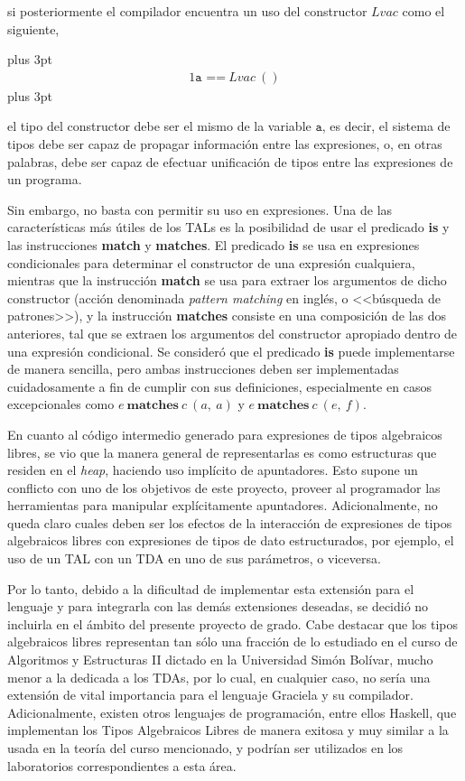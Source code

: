 {{si posteriormente el compilador encuentra un uso del constructor $Lvac$ como el
siguiente,

\abovedisplayskip=-18pt plus 3pt %
\begin{alignat*}{1}
\texttt{a ==}\  Lvac\ ()
\end{alignat*}
\abovedisplayskip=-6pt plus 3pt %

el tipo del constructor debe ser el mismo de la variable $\texttt{a}$, es decir,
el sistema de tipos debe ser capaz de propagar información entre las
expresiones, o, en otras palabras, debe ser capaz de efectuar unificación de
tipos entre las expresiones de un programa.

Sin embargo, no basta con permitir su uso en expresiones. Una de las
características más útiles de los TALs es la posibilidad de usar el predicado
\textbf{is} y las instrucciones \textbf{match} y \textbf{matches}. El predicado
\textbf{is} se usa en expresiones condicionales para determinar el constructor
de una expresión cualquiera, mientras que la instrucción \textbf{match} se usa
para extraer los argumentos de dicho constructor (acción denominada
\textit{pattern matching} en inglés, o <<búsqueda de patrones>>), y la instrucción
\textbf{matches} consiste en una composición de las dos anteriores, tal que se
extraen los argumentos del constructor apropiado dentro de una expresión
condicional. Se consideró que el predicado \textbf{is} puede implementarse de
manera sencilla, pero ambas instrucciones deben ser implementadas cuidadosamente
a fin de cumplir con sus definiciones, especialmente en casos excepcionales como
$e\ \textbf{matches}\ c\ (a,\ a)$ y $e\ \textbf{matches}\ c\ (e,\ f)$.

En cuanto al código intermedio generado para expresiones de tipos algebraicos
libres, se vio que la manera general de representarlas es como estructuras que
residen en el \textit{heap}, haciendo uso implícito de apuntadores. Esto supone un
conflicto con uno de los objetivos de este proyecto, proveer al programador las
herramientas para manipular explícitamente apuntadores. Adicionalmente, no queda
claro cuales deben ser los efectos de la interacción de expresiones de tipos
algebraicos libres con expresiones de tipos de dato estructurados, por ejemplo,
el uso de un TAL con un TDA en uno de sus parámetros, o viceversa.

Por lo tanto, debido a la dificultad de implementar esta extensión para el
lenguaje y para integrarla con las demás extensiones deseadas, se decidió no
incluirla en el ámbito del presente proyecto de grado. Cabe destacar que los
tipos algebraicos libres representan tan sólo una fracción de lo estudiado en el
curso de Algoritmos y Estructuras II dictado en la Universidad Simón Bolívar,
mucho menor a la dedicada a los TDAs, por lo cual, en cualquier caso, no sería
una extensión de vital importancia para el lenguaje Graciela y su compilador.
Adicionalmente, existen otros lenguajes de programación, entre ellos Haskell,
que implementan los Tipos Algebraicos Libres de manera exitosa y muy similar a
la usada en la teoría del curso mencionado, y podrían ser utilizados en los
laboratorios correspondientes a esta área.

}}
